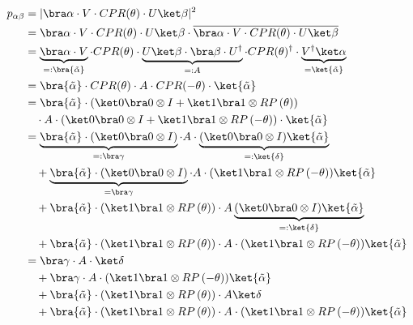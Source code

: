 \begin{equation}
    \label{eq:single-prob}
    \begin{split}
        p_{\alpha\beta}
            &= \lvert \bra\alpha \cdot V \cdot CPR(\theta) \cdot U \ket\beta \rvert^2 \\
            &= \bra\alpha \cdot V \cdot CPR(\theta) \cdot U \ket\beta
                \cdot \overline{\bra\alpha \cdot V \cdot CPR(\theta) \cdot U \ket\beta} \\
            &= \underbrace{\bra\alpha \cdot V}_{=: \bra{\tilde\alpha}} \cdot CPR(\theta)
                \cdot \underbrace{U \ket\beta \cdot \bra\beta \cdot U^\dagger}_{=: A} \cdot CPR(\theta)^\dagger
                \cdot \underbrace{V^\dagger \ket\alpha}_{=\ket{\tilde\alpha}} \\
            &= \bra{\tilde\alpha} \cdot CPR(\theta) \cdot A \cdot CPR(-\theta) \cdot \ket{\tilde\alpha} \\
            &= \bra{\tilde\alpha}
                \cdot \left(\ket 0 \bra 0 \otimes I + \ket 1 \bra 1 \otimes RP\left(\theta\right)\right) \\
                &\quad \cdot A
                \cdot \left(\ket 0 \bra 0 \otimes I + \ket 1 \bra 1 \otimes RP\left(-\theta\right)\right)
                \cdot \ket{\tilde\alpha} \\
            &= \underbrace{\bra{\tilde\alpha} \cdot (\ket 0 \bra 0 \otimes I)}_{=: \bra\gamma} \cdot A \cdot \underbrace{(\ket 0 \bra 0 \otimes I) \ket{\tilde\alpha}}_{=: \ket{\delta}} \\
                &\quad + \underbrace{\bra{\tilde\alpha} \cdot (\ket 0 \bra 0 \otimes I)}_{= \bra\gamma} \cdot A \cdot (\ket 1 \bra 1 \otimes RP\left(-\theta\right)) \ket{\tilde\alpha} \\
                &\quad + \bra{\tilde\alpha} \cdot (\ket 1 \bra 1 \otimes RP\left(\theta\right)) \cdot A \underbrace{(\ket 0 \bra 0 \otimes I) \ket{\tilde\alpha}}_{=: \ket{\delta}} \\
                &\quad + \bra{\tilde\alpha} \cdot (\ket 1 \bra 1 \otimes RP\left(\theta\right)) \cdot A \cdot (\ket 1 \bra 1 \otimes RP\left(-\theta\right)) \ket{\tilde\alpha} \\
            &= \bra\gamma \cdot A \cdot \ket\delta \\
                &\quad + \bra\gamma \cdot A \cdot (\ket 1 \bra 1 \otimes RP\left(-\theta\right)) \ket{\tilde\alpha} \\
                &\quad + \bra{\tilde\alpha} \cdot (\ket 1 \bra 1 \otimes RP\left(\theta\right)) \cdot A \ket\delta \\
                &\quad + \bra{\tilde\alpha} \cdot (\ket 1 \bra 1 \otimes RP\left(\theta\right)) \cdot A \cdot (\ket 1 \bra 1 \otimes RP\left(-\theta\right)) \ket{\tilde\alpha} \\
    \end{split}
\end{equation}

